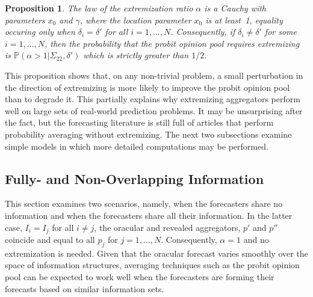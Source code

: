 \documentclass[11pt]{article}
\renewcommand{\P}{\mathbb{P}}
\newtheorem{proposition}[theorem]{Proposition}
\theoremstyle{definition}
\theoremstyle{definition}
\def\P{{\mathbb P}}
\begin{document}
\begin{proposition}
\label{positiveProbThm}
The law of the extremization ratio $\alpha$ is a Cauchy with 
parameters $x_0$ and $\gamma$, where the location parameter 
$x_0$ is at least~1, equality occuring only when $\delta_i = \delta'$ 
for all $i = 1, \dots, N$. Consequently, if $\delta_i \neq \delta'$ 
for some $i = 1, \dots, N$, then the probability that the probit 
opinion pool requires extremizing is $\P(\alpha > 1 | \Sigma_{22}, \delta')$
which is strictly greater than $1/2$. 
\end{proposition}
\noindent
This proposition shows that, on any non-trivial problem, a small
perturbation in the direction of extremizing is more likely to 
improve the probit opinion pool than to degrade it.  This partially 
explains why extremizing aggregators perform well on large sets of 
real-world prediction problems.  It may be unsurprising after the fact,
but the forecasting literature is still full of articles that perform 
probability averaging without extremizing.  The next two 
subsections examine simple models in which more detailed 
computations may be performed.  

\subsection{Fully- and Non-Overlapping Information}
\label{disjoint}
This section examines two scenarios, namely, when the forecasters share no information and when the forecasters share all their information. In the latter case, $I_{i} = I_j$ for all $i \neq j$, the oracular and revealed aggregators, $p'$ and $p''$ coincide and equal to all $p_j$ for $j = 1, \dots, N$. Consequently, $\alpha = 1$ and no extremization is needed. Given that the oracular forecast varies smoothly over the space of  information structures, averaging techniques such as the probit opinion pool can be expected to work well when the forecasters are forming their forecasts based on similar information sets.
\end{document}
